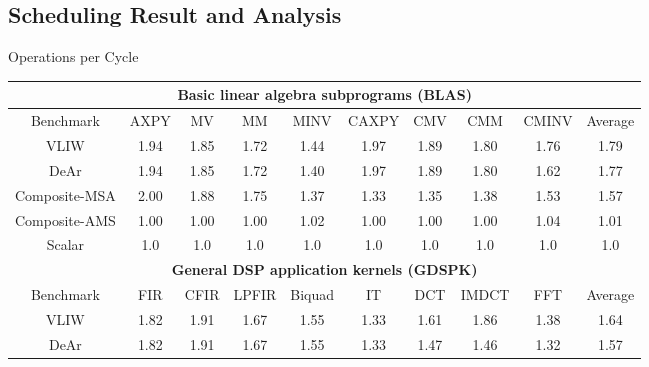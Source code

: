 \documentclass{beamer}
\begin{document}
\begin{CJK}{UTF8}{bkai}
            \subsection{Scheduling Result and Analysis}

            \begin{frame}{Operations per Cycle}
                \vspace{-2em}
                \begin{table}[!ht]
                    \centering
                    \resizebox{\columnwidth}{!}
                    {
                        \begin{tabular}{|c|c|c|c|c|c|c|c|c|c|}
                            \hline
                            \multicolumn{10}{|c|}{\textbf{Basic linear algebra subprograms (BLAS)}} \\ \hline
                            Benchmark  &  AXPY  &  MV  &  MM  &  MINV  &  CAXPY  &  CMV  &  CMM  &  CMINV  &  Average \\ \hline 
                            VLIW  &   1.94  &   1.85  &   1.72  &   1.44  &   1.97  &   1.89  &   1.80  &   1.76  &   1.79     \\ \hline 
                            DeAr  &   1.94  &   1.85  &   1.72  &   1.40  &   1.97  &   1.89  &   1.80  &   1.62  &   1.77     \\ \hline
                            Composite-MSA  &   2.00  &   1.88  &   1.75  &   1.37  &   1.33  &   1.35  &   1.38  &   1.53  &   1.57     \\ \hline 
                            Composite-AMS  &   1.00  &   1.00  &   1.00  &   1.02  &   1.00  &   1.00  &   1.00  &   1.04  &   1.01     \\ \hline 
                            Scalar  & 1.0  & 1.0  & 1.0  & 1.0  & 1.0  & 1.0  & 1.0  & 1.0  & 1.0 \\ \hline 
                            \multicolumn{10}{|c|}{\textbf{General DSP application kernels (GDSPK)}}                     \\ \hline
                            Benchmark  &  FIR  &  CFIR  &  LPFIR  &  Biquad  &  IT  &  DCT  &  IMDCT  &  FFT  &  Average \\ \hline 
                            VLIW  &   1.82  &   1.91  &   1.67  &   1.55  &   1.33  &   1.61  &   1.86  &   1.38  &   1.64     \\ \hline 
                            DeAr  &   1.82  &   1.91  &   1.67  &   1.55  &   1.33  &   1.47  &   1.46  &   1.32  &   1.57     \\ \hline 

\end{tabular}}
\end{table}
\end{frame}
\end{CJK}
\end{document}
